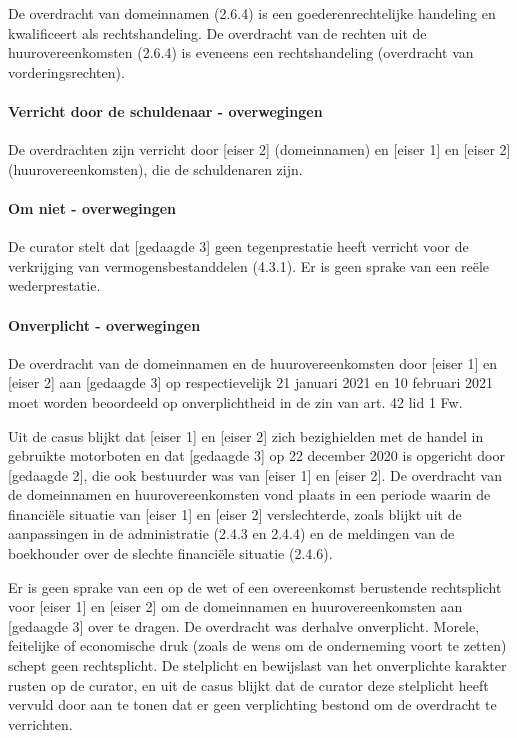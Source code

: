 \documentclass[
  dutch,
  a4paper,
]{article}
\begin{document}
De overdracht van domeinnamen (2.6.4) is een goederenrechtelijke handeling en kwalificeert als rechtshandeling. De overdracht van de rechten uit de huurovereenkomsten (2.6.4) is eveneens een rechtshandeling (overdracht van vorderingsrechten).

\paragraph{Verricht door de schuldenaar - overwegingen}\label{verricht-door-de-schuldenaar---overwegingen-24}

De overdrachten zijn verricht door {[}eiser 2{]} (domeinnamen) en {[}eiser 1{]} en {[}eiser 2{]} (huurovereenkomsten), die de schuldenaren zijn.

\paragraph{Om niet - overwegingen}\label{om-niet---overwegingen-24}

De curator stelt dat {[}gedaagde 3{]} geen tegenprestatie heeft verricht voor de verkrijging van vermogensbestanddelen (4.3.1). Er is geen sprake van een reële wederprestatie.

\paragraph{Onverplicht - overwegingen}\label{onverplicht---overwegingen-24}

De overdracht van de domeinnamen en de huurovereenkomsten door {[}eiser 1{]} en {[}eiser 2{]} aan {[}gedaagde 3{]} op respectievelijk 21 januari 2021 en 10 februari 2021 moet worden beoordeeld op onverplichtheid in de zin van art. 42 lid 1 Fw.

Uit de casus blijkt dat {[}eiser 1{]} en {[}eiser 2{]} zich bezighielden met de handel in gebruikte motorboten en dat {[}gedaagde 3{]} op 22 december 2020 is opgericht door {[}gedaagde 2{]}, die ook bestuurder was van {[}eiser 1{]} en {[}eiser 2{]}. De overdracht van de domeinnamen en huurovereenkomsten vond plaats in een periode waarin de financiële situatie van {[}eiser 1{]} en {[}eiser 2{]} verslechterde, zoals blijkt uit de aanpassingen in de administratie (2.4.3 en 2.4.4) en de meldingen van de boekhouder over de slechte financiële situatie (2.4.6).

Er is geen sprake van een op de wet of een overeenkomst berustende rechtsplicht voor {[}eiser 1{]} en {[}eiser 2{]} om de domeinnamen en huurovereenkomsten aan {[}gedaagde 3{]} over te dragen. De overdracht was derhalve onverplicht. Morele, feitelijke of economische druk (zoals de wens om de onderneming voort te zetten) schept geen rechtsplicht. De stelplicht en bewijslast van het onverplichte karakter rusten op de curator, en uit de casus blijkt dat de curator deze stelplicht heeft vervuld door aan te tonen dat er geen verplichting bestond om de overdracht te verrichten.
\end{document}
